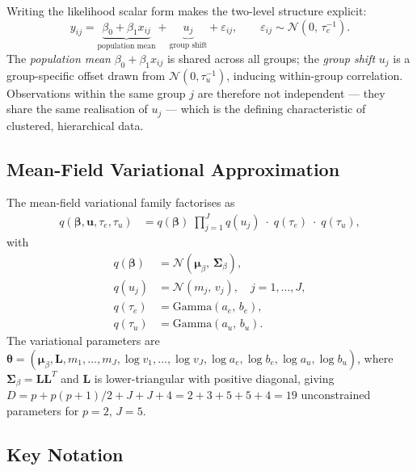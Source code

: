 \documentclass[11pt,a4paper]{article}
\newcommand{\N}{\mathcal{N}}
\begin{document}
Writing the likelihood scalar form makes the two-level structure explicit:
\begin{equation}
  y_{ij} = \underbrace{\beta_0 + \beta_1 x_{ij}}_{\text{population mean}}
          + \underbrace{u_j}_{\text{group shift}}
          + \varepsilon_{ij}, \qquad
  \varepsilon_{ij} \sim \mathcal{N}(0,\,\tau_e^{-1}).
\end{equation}
The \emph{population mean} $\beta_0 + \beta_1 x_{ij}$ is shared across all groups;
the \emph{group shift} $u_j$ is a group-specific offset drawn from
$\mathcal{N}(0, \tau_u^{-1})$, inducing within-group correlation.
Observations within the same group $j$ are therefore not independent --- they
share the same realisation of $u_j$ --- which is the defining characteristic of
clustered, hierarchical data.

\subsection{Mean-Field Variational Approximation}

The mean-field variational family factorises as
\begin{align}
q(\bm{\beta},\mathbf{u},\tau_e,\tau_u)
  &= q(\bm{\beta})\;\prod_{j=1}^{J} q(u_j)\;\cdot\; q(\tau_e)\;\cdot\; q(\tau_u),
\end{align}
with
\begin{align}
q(\bm{\beta}) &= \N(\bm{\mu}_\beta,\,\bm{\Sigma}_\beta), \\
q(u_j) &= \mathcal{N}(m_j,\, v_j), \quad j=1,\ldots,J, \\
q(\tau_e) &= \mathrm{Gamma}(a_e,\, b_e), \\
q(\tau_u) &= \mathrm{Gamma}(a_u,\, b_u).
\end{align}
The variational parameters are
$\bm{\theta} = (\bm{\mu}_\beta, \bm{L}, m_1,\ldots,m_J, \log v_1,\ldots,\log v_J,
\log a_e, \log b_e, \log a_u, \log b_u)$,
where $\bm{\Sigma}_\beta = \bm{L}\bm{L}^T$ and $\bm{L}$ is lower-triangular with
positive diagonal, giving $D = p + p(p+1)/2 + J + J + 4 = 2 + 3 + 5 + 5 + 4 = 19$
unconstrained parameters for $p=2$, $J=5$.

\subsection{Key Notation}
\end{document}
